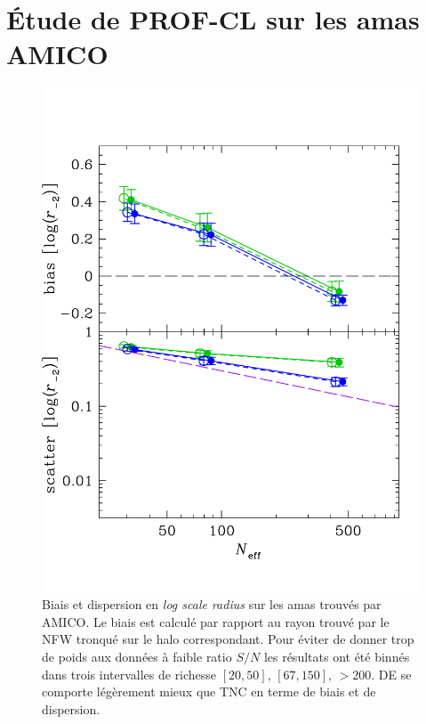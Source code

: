 \documentclass[a4paper,11pt]{article}
\numberwithin{equation}{section}
\begin{document}
  
  
  
  
  \newpage
  \section{Étude de PROF-CL sur les amas AMICO}
  \label{sec:AMICO}
  
   \begin{figure}
     \vspace{-45pt}
     \includegraphics[width=\linewidth]{loga_bias_scatter_AMICO.pdf}
     \vspace{-40pt}
     \caption{Biais et dispersion en \textit{log scale radius} sur les amas trouvés par AMICO. Le biais est calculé par rapport au rayon trouvé par le NFW tronqué sur le halo correspondant. Pour éviter de donner trop de poids aux données à faible ratio $S/N$ les résultats ont été binnés dans trois intervalles de richesse $[20, 50]$, $[67, 150]$, $>200$. DE se comporte légèrement mieux que TNC en terme de biais et de dispersion.}
     \label{AMICO}
   \end{figure}
    
\end{document}
